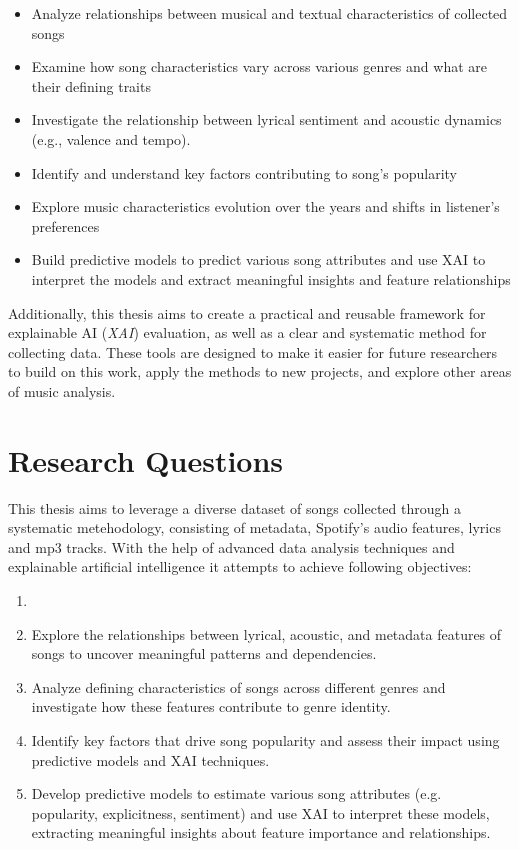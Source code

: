 \begin{itemize} 
  \item Analyze relationships between musical and textual characteristics of
    collected songs
  \item Examine how song characteristics vary across various genres and what
    are their defining traits
  \item Investigate the relationship between lyrical sentiment and acoustic
    dynamics (e.g., valence and tempo).
  \item Identify and understand key factors contributing to song's popularity
  \item Explore music characteristics evolution over the years and shifts in listener's preferences
  \item Build predictive models to predict various song attributes and use XAI
    to interpret the models and extract meaningful insights and feature
    relationships
\end{itemize}

Additionally, this thesis aims to create a practical and reusable framework for
explainable AI (\textit{XAI}) evaluation, as well as a clear and systematic
method for collecting data. These tools are designed to make it easier for
future researchers to build on this work, apply the methods to new projects,
and explore other areas of music analysis.


\section{Research Questions}
\label{sec:researchquestions}
This thesis aims to leverage a diverse dataset of songs collected through a
systematic metehodology, consisting of metadata, Spotify's audio features,
lyrics and mp3 tracks. With the help of advanced data analysis techniques and
explainable artificial intelligence it attempts to achieve following
objectives:
\begin{enumerate}
  \item \item Explore the relationships between lyrical, acoustic, and metadata
    features of songs to uncover meaningful patterns and dependencies.
  \item Analyze defining characteristics of songs across different genres and
    investigate how these features contribute to genre identity.
  \item  Identify key factors that drive song popularity and assess their
    impact using predictive models and XAI techniques.
  \item  Develop predictive models to estimate various song attributes (e.g.
    popularity, explicitness, sentiment) and use XAI to interpret these models,
    extracting meaningful insights about feature importance and relationships.
\end{enumerate}

